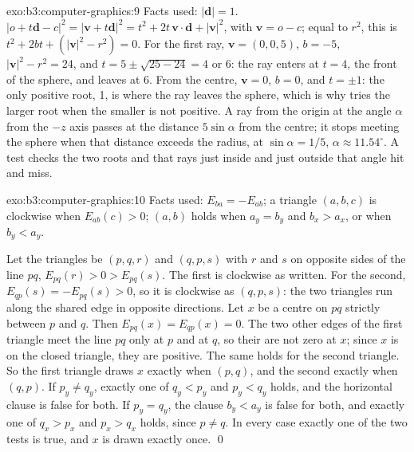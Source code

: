 \begin{solution}{exo:b3:computer-graphics:9}
Facts used: $|\mathbf d| = 1$. $|o + t\mathbf d - c|^2 = |\mathbf v + t\mathbf d|^2 = t^2 + 2t\,\mathbf v \cdot \mathbf d + |\mathbf v|^2$, with $\mathbf v = o - c$; equal to $r^2$, this is $t^2 + 2bt + (|\mathbf v|^2 - r^2) = 0$. For the first ray, $\mathbf v = (0, 0, 5)$, $b = -5$, $|\mathbf v|^2 - r^2 = 24$, and $t = 5 \pm \sqrt{25 - 24} = 4$ or 6: the ray enters at $t = 4$, the front of the sphere, and leaves at 6. From the centre, $\mathbf v = 0$, $b = 0$, and $t = \pm1$: the only positive root, 1, is where the ray leaves the sphere, which is why  tries the larger root when the smaller is not positive. A ray from the origin at the angle $\alpha$ from the $-z$ axis passes at the distance $5\sin\alpha$ from the centre; it stops meeting the sphere when that distance exceeds the radius, at $\sin\alpha = 1/5$, $\alpha \approx 11.54^\circ$. A test checks the two roots and that rays just inside and just outside that angle hit and miss.
\end{solution}

\begin{solution}{exo:b3:computer-graphics:10}
Facts used: $E_{ba} = -E_{ab}$; a triangle $(a, b, c)$ is clockwise when $E_{ab}(c) > 0$; $(a, b)$ holds when $a_y = b_y$ and $b_x > a_x$, or when $b_y < a_y$.

Let the triangles be $(p, q, r)$ and $(q, p, s)$ with $r$ and $s$ on opposite sides of the line $pq$, $E_{pq}(r) > 0 > E_{pq}(s)$. The first is clockwise as written. For the second, $E_{qp}(s) = -E_{pq}(s) > 0$, so it is clockwise as $(q, p, s)$: the two triangles run along the shared edge in opposite directions. Let $x$ be a centre on $pq$ strictly between $p$ and $q$. Then $E_{pq}(x) = E_{qp}(x) = 0$. The two other edges of the first triangle meet the line $pq$ only at $p$ and at $q$, so their  are not zero at $x$; since $x$ is on the closed triangle, they are positive. The same holds for the second triangle. So the first triangle draws $x$ exactly when $(p, q)$, and the second exactly when $(q, p)$. If $p_y \neq q_y$, exactly one of $q_y < p_y$ and $p_y < q_y$ holds, and the horizontal clause is false for both. If $p_y = q_y$, the clause $b_y < a_y$ is false for both, and exactly one of $q_x > p_x$ and $p_x > q_x$ holds, since $p \neq q$. In every case exactly one of the two tests is true, and $x$ is drawn exactly once. \qed
\end{solution}

